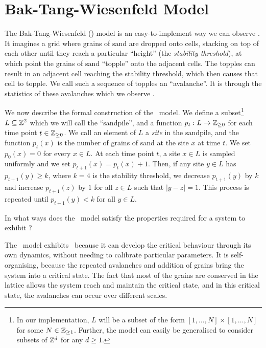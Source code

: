 \section{Bak-Tang-Wiesenfeld Model}

The Bak-Tang-Wiesenfeld (\btw) model is an easy-to-implement way we can observe \soc. It imagines a grid where grains of sand are dropped onto cells, stacking on top of each other until they reach a particular ``height'' (the \emph{stability threshold}), at which point the grains of sand ``topple'' onto the adjacent cells. The topples can result in an adjacent cell reaching the stability threshold, which then causes that cell to topple. We call such a sequence of topples an ``avalanche''. It is through the statistics of these avalanches which we observe \soc.

We now describe the formal construction of the \btw\ model. We define a subset\footnote{In our implementation, $L$ will be a subset of the form $[1,\ldots, N]\times [1,\ldots, N]$ for some $N\in \mathbb{Z}_{\ge 1}$. Further, the model can easily be generalised to consider subsets of $\mathbb{Z}^d$ for any $d\ge 1$.} $L\subseteq \mathbb{Z}^2$ which we will call the ``sandpile'', and a function $p_t: L\rightarrow \mathbb{Z}_{\ge 0}$ for each time point $t\in \mathbb{Z}_{\ge 0}$. We call an element of $L$ a \emph{site} in the sandpile, and the function $p_t(x)$ is the number of grains of sand at the site $x$ at time $t$. We set $p_0(x)=0$ for every $x\in L$. At each time point $t$, a site $x\in L$ is sampled uniformly and we set $p_{t+1}(x)=p_t(x) + 1$. Then, if any site $y\in L$ has $p_{t+1}(y)\ge k$, where $k=4$ is the stability threshold, we decrease $p_{t+1}(y)$ by $k$ and increase $p_{t+1}(z)$ by $1$ for all $z\in L$ such that $|y-z|=1$. This process is repeated until $p_{t+1}(y) < k$ for all $y\in L$.


\begin{question}
    In what ways does the \btw\ model satisfy the properties required for a system to exhibit \soc?
\end{question}

The \btw\ model exhibits \soc\ because it can develop the critical behaviour through its own dynamics, without needing to calibrate particular parameters. It is self-organising, because the repeated avalanches and addition of grains bring the system into a critical state. The fact that most of the grains are conserved in the lattice allows the system reach and maintain the critical state, and in this critical state, the avalanches can occur over different scales.

